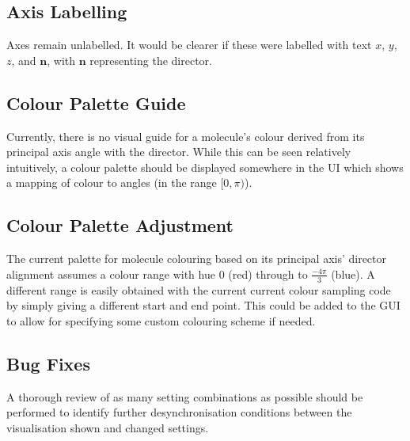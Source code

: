 \subsection{Axis Labelling}
Axes remain unlabelled. It would be clearer if these were labelled with text $x$, $y$, $z$, and $\mathbf{n}$, with $\mathbf{n}$ representing the director.

\subsection{Colour Palette Guide}
Currently, there is no visual guide for a molecule's colour derived from its principal axis angle with the director. While this can be seen relatively intuitively, a colour palette should be displayed somewhere in the UI which shows a mapping of colour to angles (in the range $[0, \pi)$).

\subsection{Colour Palette Adjustment}
The current palette for molecule colouring based on its principal axis' director alignment assumes a colour range with hue $0$ (red) through to $\frac{-4\pi}{3}$ (blue). A different range is easily obtained with the current current colour sampling code by simply giving a different start and end point. This could be added to the GUI to allow for specifying some custom colouring scheme if needed.

\subsection{Bug Fixes}
A thorough review of as many setting combinations as possible should be performed to identify further desynchronisation conditions between the visualisation shown and changed settings.
